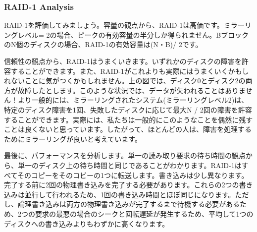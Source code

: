 \hypertarget{raid-1-analysis}{%
\subsubsection*{RAID-1 Analysis}\label{raid-1-analysis}}

RAID-1を評価してみましょう。容量の観点から、RAID-1は高価です。ミラーリングレベル=
2の場合、ピークの有効容量の半分しか得られません。BブロックのN個のディスクの場合、RAID-1の有効容量は(N・B)/
2です。

信頼性の観点から、RAID-1はうまくいきます。いずれかのディスクの障害を許容することができます。また、RAID-1がこれよりも実際にはうまくいくかもしれないことに気がつくかもしれません。上の図では、ディスク0とディスク2の両方が故障したとします。このような状況では、データが失われることはありません！より一般的には、ミラーリングされたシステム(ミラーリングレベル2)は、特定のディスク障害を1回、失敗したディスクに応じて最大N
/
2回の障害を許容することができます。実際には、私たちは一般的にこのようなことを偶然に残すことは良くないと思っています。したがって、ほとんどの人は、障害を処理するためにミラーリングが良いと考えています。

最後に、パフォーマンスを分析します。単一の読み取り要求の待ち時間の観点から、単一のディスク上の待ち時間と同じであることがわかります。RAID-1はすべてそのコピーをそのコピーの1つに転送します。書き込みは少し異なります。完了する前に2回の物理書き込みを完了する必要があります。これらの2つの書き込みは並行して行われるため、1回の書き込み時間とほぼ同じになります。ただし、論理書き込みは両方の物理書き込みが完了するまで待機する必要があるため、2つの要求の最悪の場合のシークと回転遅延が発生するため、平均して1つのディスクへの書き込みよりもわずかに高くなります。

